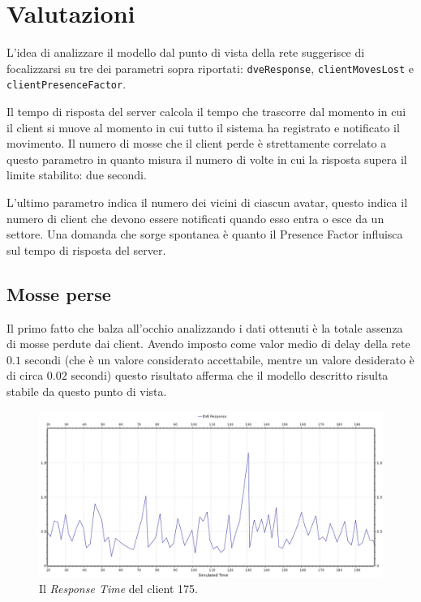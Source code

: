 \documentclass[a4paper, 11pt, oneside]{book}
\theoremstyle{definition}
\theoremstyle{remark}
\begin{document}
\section{Valutazioni}
L'idea di analizzare il modello dal punto di vista della rete suggerisce di
focalizzarsi su tre dei parametri sopra riportati: \texttt{dveResponse},
\texttt{clientMovesLost} e \texttt{clientPresenceFactor}.

Il tempo di risposta del server calcola il tempo che trascorre dal momento in
cui il client si muove al momento in cui tutto il sistema ha registrato e
notificato il movimento. Il numero di mosse che il client perde è strettamente
correlato a questo parametro in quanto misura il numero di volte in cui
la risposta supera il limite stabilito: due secondi.

L'ultimo parametro indica il numero dei vicini di ciascun avatar, questo
indica il numero di client che devono essere notificati quando esso
entra o esce da un settore. Una domanda che sorge spontanea è quanto il
Presence Factor influisca sul tempo di risposta del server.

\subsection{Mosse perse}
Il primo fatto che balza all'occhio analizzando i dati ottenuti è la totale
assenza di mosse perdute dai client. Avendo imposto come valor medio di delay
della rete $0.1$ secondi (che è un valore considerato accettabile, mentre un
valore desiderato è di circa $0.02$ secondi) questo risultato afferma che il
modello descritto risulta stabile da questo punto di vista.

\begin{figure}
\begin{center}
\includegraphics[scale=0.4]{response.jpeg}
\end{center}
\caption{Il \emph{Response Time} del client 175.}
\label{response}
\end{figure}
\end{document}
